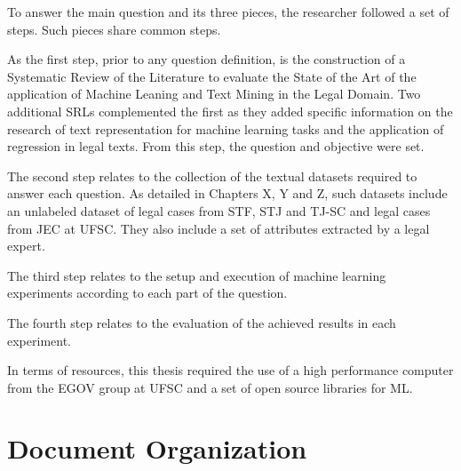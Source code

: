 % 

To answer the main question and its three pieces, the researcher followed a set of steps. Such pieces share common steps.

As the first step, prior to any question definition, is the construction of a Systematic Review of the Literature to evaluate the State of the Art of the application of Machine Leaning and Text Mining in the Legal Domain. Two additional SRLs complemented the first as they added specific information on the research of text representation for machine learning tasks and the application of regression in legal texts. From this step, the question and objective were set.

The second step relates to the collection of the textual datasets required to answer each question. As detailed in Chapters X, Y and Z, such datasets include an unlabeled dataset of legal cases from STF, STJ and TJ-SC and legal cases from JEC at UFSC. They also include a set of attributes extracted by a legal expert.

The third step relates to the setup and execution of machine learning experiments according to each part of the question.

The fourth step relates to the evaluation of the achieved  results in each experiment.

In terms of resources, this thesis required the use of a high performance computer from the EGOV group at UFSC and a set of open source libraries for ML.




\section{Document Organization}

